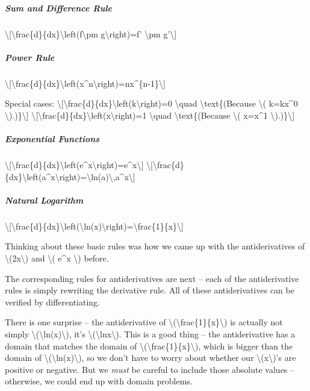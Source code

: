 \hypertarget{sum-and-difference-rule}{%
\subparagraph{Sum and Difference Rule}\label{sum-and-difference-rule}}

\textbackslash{}{[}\textbackslash{}frac\{d\}\{dx\}\textbackslash{}left(f\textbackslash{}pm
g\textbackslash{}right)=f' \textbackslash{}pm g'\textbackslash{}{]}

\hypertarget{power-rule}{%
\subparagraph{Power Rule}\label{power-rule}}

\textbackslash{}{[}\textbackslash{}frac\{d\}\{dx\}\textbackslash{}left(x\^{}n\textbackslash{}right)=nx\^{}\{n-1\}\textbackslash{}{]}

Special cases:
\textbackslash{}{[}\textbackslash{}frac\{d\}\{dx\}\textbackslash{}left(k\textbackslash{}right)=0
\textbackslash{}quad \textbackslash{}text\{(Because \textbackslash{}(
k=kx\^{}0 \textbackslash{}).)\}\textbackslash{}{]}
\textbackslash{}{[}\textbackslash{}frac\{d\}\{dx\}\textbackslash{}left(x\textbackslash{}right)=1
\textbackslash{}quad \textbackslash{}text\{(Because \textbackslash{}(
x=x\^{}1 \textbackslash{}).)\}\textbackslash{}{]}

\hypertarget{exponential-functions}{%
\subparagraph{Exponential Functions}\label{exponential-functions}}

\textbackslash{}{[}\textbackslash{}frac\{d\}\{dx\}\textbackslash{}left(e\^{}x\textbackslash{}right)=e\^{}x\textbackslash{}{]}
\textbackslash{}{[}\textbackslash{}frac\{d\}\{dx\}\textbackslash{}left(a\^{}x\textbackslash{}right)=\textbackslash{}ln(a)\textbackslash{},a\^{}x\textbackslash{}{]}

\hypertarget{natural-logarithm}{%
\subparagraph{Natural Logarithm}\label{natural-logarithm}}

\textbackslash{}{[}\textbackslash{}frac\{d\}\{dx\}\textbackslash{}left(\textbackslash{}ln(x)\textbackslash{}right)=\textbackslash{}frac\{1\}\{x\}\textbackslash{}{]}

Thinking about these basic rules was how we came up with the
antiderivatives of \textbackslash{}(2x\textbackslash{}) and
\textbackslash{}( e\^{}x \textbackslash{}) before.

The corresponding rules for antiderivatives are next -- each of the
antiderivative rules is simply rewriting the derivative rule. All of
these antiderivatives can be verified by differentiating.

There is one surprise -- the antiderivative of
\textbackslash{}(\textbackslash{}frac\{1\}\{x\}\textbackslash{}) is
actually not simply
\textbackslash{}(\textbackslash{}ln(x)\textbackslash{}), it's
\textbackslash{}(\textbackslash{}ln\textbar{}x\textbar{}\textbackslash{}).
This is a good thing -- the antiderivative has a domain that matches the
domain of
\textbackslash{}(\textbackslash{}frac\{1\}\{x\}\textbackslash{}), which
is bigger than the domain of
\textbackslash{}(\textbackslash{}ln(x)\textbackslash{}), so we don't
have to worry about whether our \textbackslash{}(x\textbackslash{})'s
are positive or negative. But we \emph{must} be careful to include those
absolute values -- otherwise, we could end up with domain problems.

